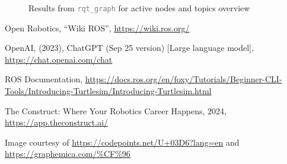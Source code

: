\documentclass[conference]{IEEEtran}
\newcommand{\command}[1]{\textcolor{gray}{\footnotesize \texttt{#1}}}
\begin{document}
\begin{figure}[htbp]
    \centering
     \vfill
    \caption{Results from \command{rqt\_graph} for active nodes and topics overview}
    \label{fig:graph_results}
\end{figure}
\vspace{30px}


\begin{thebibliography}{00}
     Open Robotics, ``Wiki ROS'', \url{https://wiki.ros.org/}

     OpenAI, (2023), ChatGPT (Sep 25 version) [Large language model], \url{https://chat.openai.com/chat}

     ROS Documentation, \url{https://docs.ros.org/en/foxy/Tutorials/Beginner-CLI-Tools/Introducing-Turtlesim/Introducing-Turtlesim.html}

     The Construct: Where Your Robotics Career Happens, 2024, \url{https://app.theconstruct.ai/}

     Image courtesy of \url{https://codepoints.net/U+03D6?lang=en} and \url{https://graphemica.com/%CF%96} 
\end{thebibliography}
\end{document}
